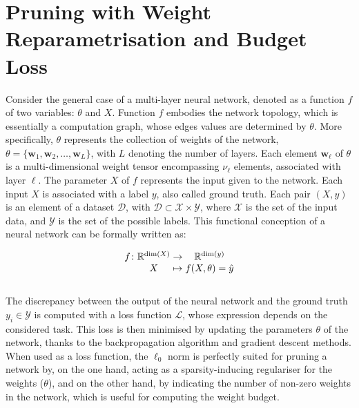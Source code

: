 \section{Pruning with Weight Reparametrisation and Budget Loss}\label{sec:chap1:pruning}
Consider the general case of a multi-layer neural network, denoted as a function
$f$ of two variables: $\theta$ and $X$. Function $f$ embodies the network
topology, which is essentially a computation graph, whose edges values are
determined by $\theta$. More specifically, $\theta$ represents the collection of
weights of the network, $\theta = \{\mathbf{w}_1, \mathbf{w}_2, \ldots,
\mathbf{w}_L\}$, with $L$ denoting the number of layers. Each element
$\mathbf{w}_\ell$ of $\theta$ is a multi-dimensional weight tensor encompassing
$\nu_\ell$ elements, associated with layer $\ell$. The parameter $X$ of $f$
represents the input given to the network. Each input $X$ is associated with a
label $y$, also called ground truth. Each pair $(X,y)$ is an element of a
dataset $\mathcal{D}$, with $\mathcal{D} \subset \mathcal{X} \times
\mathcal{Y}$, where $\mathcal{X}$ is the set of the input data, and
$\mathcal{Y}$ is the set of the possible labels. This functional conception of a
neural network can be formally written as:

\begin{equation}
    \begingroup
  \setlength\arraycolsep{0pt}
  f \colon\begin{array}[t]{c >{{}}c<{{}} c}
             \mathbb{R}^{\dim (X)} & \to & \mathbb{R}^{\dim (y)} \\ 
             X & \mapsto & f(X, \theta) = \hat{y} 
          \end{array}
  \endgroup
\end{equation}\\

The discrepancy between the output of the neural network and the ground truth
$y_i \in \mathcal{Y}$ is computed with a loss function $\mathcal{L}$, whose
expression depends on the considered task. This loss is then minimised by
updating the parameters $\theta$ of the network, thanks to the backpropagation
algorithm \cite{rumelhart1985learning,rumelhart1986learning} and gradient
descent methods.\\

When used as a loss function, the $\ell_0$ norm is perfectly suited for pruning
a network by, on the one hand, acting as a sparsity-inducing regulariser for the
weights ($\theta$), and on the other hand, by indicating the number of non-zero
weights in the network, which is useful for computing the weight budget. \\

